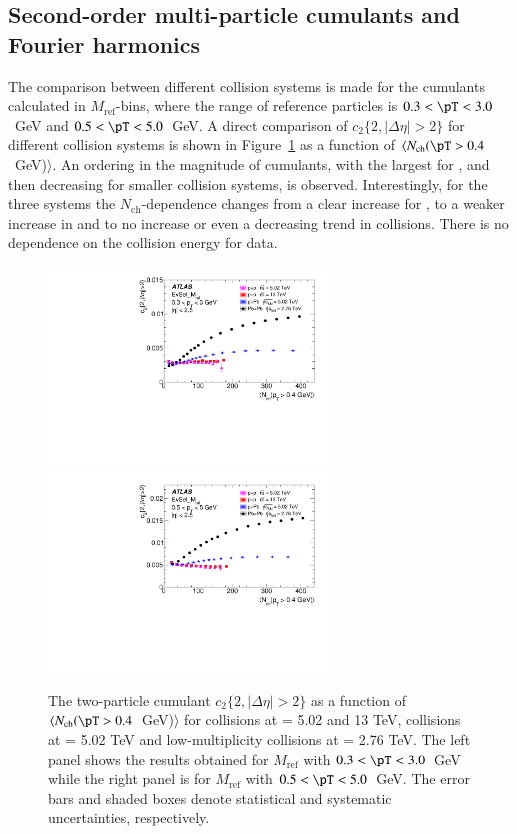 \documentclass[cernpreprint,texlive=2014,txfonts,UKenglish]{latex/atlasdoc}
\begin{document}
\subsection{Second-order multi-particle cumulants and Fourier harmonics}
\label{sec:elliptic}
The comparison between different collision systems is made for the cumulants calculated in $M_{\mathrm{ref}}$-bins, where the \pT range of reference particles is $0.3< \pT < 3.0$~GeV and $0.5 < \pT < 5.0$~GeV.
A direct comparison of  $c_2\{2,|\Delta\eta|>2\}$ for different collision systems is shown in Figure~\ref{fig:cum22All} as a function of $\langle N_{\mathrm{ch}}(\pT > 0.4$~GeV)$\rangle$.   An ordering in the magnitude of cumulants, with the largest for \PbPb, and then decreasing for smaller collision systems, is observed. Interestingly, for the three systems the $N_{\mathrm{ch}}$-dependence changes from a clear increase for \PbPb, to a weaker increase in \pPb and to no increase or even a decreasing trend  in \pp collisions. There is no dependence on the collision energy for \pp data.
\begin{figure}[ht!]
\begin{center}
\includegraphics[width=75mm]{fig_05a.pdf}
\includegraphics[width=75mm]{fig_05b.pdf}
\caption{The two-particle cumulant $c_2\{2,|\Delta\eta|>2\}$ as a function of $\langle N_{\mathrm{ch}}(\pT > 0.4$~GeV)$\rangle$  for \pp collisions at \sqs= 5.02 and 13 TeV, \pPb collisions at \sqn= 5.02 TeV and low-multiplicity \PbPb collisions at \sqn= 2.76 TeV. The left panel shows the results obtained for $M_{\mathrm{ref}}$ with  $0.3< \pT < 3.0$~GeV while the right panel is for $M_{\mathrm{ref}}$ with  $0.5< \pT < 5.0$~GeV. The error bars and shaded boxes denote statistical and systematic uncertainties, respectively.}
\label{fig:cum22All} 
\end{center}
\end{figure} 
\end{document}

